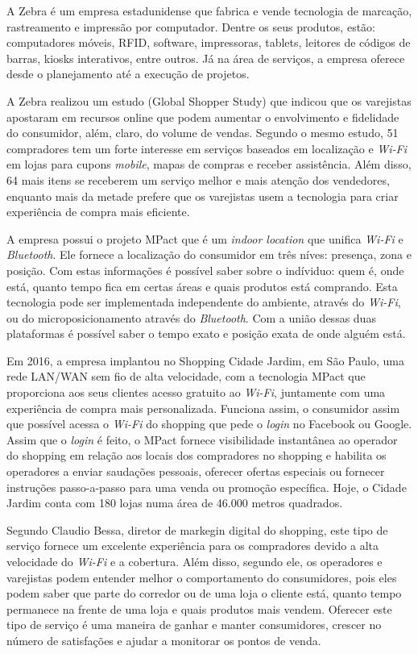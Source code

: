 A Zebra é um empresa estadunidense que fabrica e vende tecnologia de marcação,
rastreamento e impressão por computador. Dentre os seus produtos, estão:
computadores móveis, RFID, software, impressoras, tablets, leitores de códigos
de barras, kiosks interativos, entre outros. Já na área de serviços, a empresa
oferece desde o planejamento até a execução de projetos.

A Zebra realizou um estudo (Global Shopper Study) que indicou que os varejistas
apostaram em recursos online que podem aumentar o envolvimento e fidelidade do
consumidor, além, claro, do volume de vendas. Segundo o mesmo estudo, 51%
compradores tem um forte interesse em serviços baseados em localização e
\emph{Wi-Fi} em lojas para cupons \emph{mobile}, mapas de compras e receber
assistência. Além disso, 64%
mais itens se receberem um serviço melhor e mais atenção dos vendedores,
enquanto mais da metade prefere que os varejistas usem a tecnologia para criar
experiência de compra mais eficiente.

A empresa possui o projeto MPact que é um \emph{indoor location} que unifica
\emph{Wi-Fi} e \emph{Bluetooth}. Ele fornece a localização do consumidor em três
níves: presença, zona e posição. Com estas informações é possível saber sobre o
indíviduo: quem é, onde está, quanto tempo fica em certas áreas e quais
produtos está comprando. Esta tecnologia pode ser implementada independente do
ambiente, através do \emph{Wi-Fi}, ou do microposicionamento através do
\emph{Bluetooth}. Com a união dessas duas plataformas é possível saber o tempo
exato e posição exata de onde alguém está.

Em 2016, a empresa implantou no Shopping Cidade Jardim, em São Paulo, uma rede
LAN/WAN sem fio de alta velocidade, com a tecnologia MPact que proporciona aos
seus clientes acesso gratuito ao \emph{Wi-Fi}, juntamente com uma experiência de
compra mais personalizada. Funciona assim, o consumidor assim que possível
acessa o \emph{Wi-Fi} do shopping que pede o \emph{login} no Facebook ou Google. Assim
que o \emph{login} é feito, o MPact fornece visibilidade instantânea ao operador do
shopping em relação aos locais dos compradores no shopping e habilita os
operadores a enviar saudações pessoais, oferecer ofertas especiais ou fornecer
instruções passo-a-passo para uma venda ou promoção específica. Hoje, o Cidade
Jardim conta com 180 lojas numa área de 46.000 metros quadrados.

Segundo Claudio Bessa, diretor de markegin digital do shopping, este tipo de
serviço fornece um excelente experiência para os compradores devido a alta
velocidade do \emph{Wi-Fi} e a cobertura. Além disso, segundo ele, os operadores
e varejistas podem entender melhor o comportamento do consumidores, pois eles
podem saber que parte do corredor ou de uma loja o cliente está, quanto tempo
permanece na frente de uma loja e quais produtos mais vendem. Oferecer este tipo
de serviço é uma maneira de ganhar e manter consumidores, crescer no número de
satisfações e ajudar a monitorar os pontos de venda.

